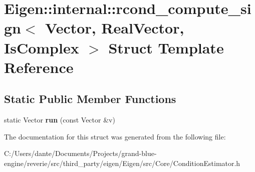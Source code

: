 \hypertarget{struct_eigen_1_1internal_1_1rcond__compute__sign}{}\section{Eigen\+::internal\+::rcond\+\_\+compute\+\_\+sign$<$ Vector, Real\+Vector, Is\+Complex $>$ Struct Template Reference}
\label{struct_eigen_1_1internal_1_1rcond__compute__sign}
\subsection*{Static Public Member Functions}
\begin{DoxyCompactItemize}
\item 
\mbox{\label{struct_eigen_1_1internal_1_1rcond__compute__sign_a0c1e067cca0d2d9884c310fb86388361}} 
static Vector {\bfseries run} (const Vector \&v)
\end{DoxyCompactItemize}


The documentation for this struct was generated from the following file\+:\begin{DoxyCompactItemize}
\item 
C\+:/\+Users/dante/\+Documents/\+Projects/grand-\/blue-\/engine/reverie/src/third\+\_\+party/eigen/\+Eigen/src/\+Core/Condition\+Estimator.\+h\end{DoxyCompactItemize}
